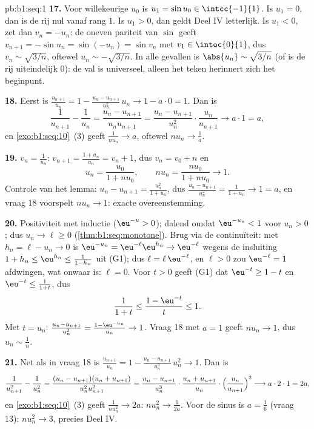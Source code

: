 \begin{solution}{pb:b1:seq:1}
\textbf{17.} Voor willekeurige $u_0$ is $u_1 = \sin u_0 \in
\intcc{-1}{1}$. Is $u_1 = 0$, dan is de rij nul vanaf rang $1$. Is $u_1 >
0$, dan geldt Deel IV letterlijk. Is $u_1 < 0$, zet dan $v_n = -u_n$: de
oneven pariteit van $\sin$ geeft $v_{n+1} = -\sin u_n = \sin(-u_n) = \sin
v_n$ met $v_1 \in \intoc{0}{1}$, dus $v_n \sim \sqrt{3/n}$, oftewel $u_n
\sim -\sqrt{3/n}$. In alle gevallen is $\abs{u_n} \sim \sqrt{3/n}$ (of is
de rij uiteindelijk $0$): de val is universeel, alleen het teken
herinnert zich het beginpunt.

\textbf{18.} Eerst is $\frac{u_{n+1}}{u_n} = 1 - \frac{u_n -
u_{n+1}}{u_n^2}\,u_n \to 1 - a \cdot 0 = 1$. Dan is
\[
\frac{1}{u_{n+1}} - \frac{1}{u_n}
= \frac{u_n - u_{n+1}}{u_n u_{n+1}}
= \frac{u_n - u_{n+1}}{u_n^2}\cdot\frac{u_n}{u_{n+1}}
\longrightarrow a \cdot 1 = a ,
\]
en \cref{exo:b1:seq:10}~(3) geeft $\frac{1}{n u_n} \to a$, oftewel $n u_n
\to \frac1a$.

\textbf{19.} $v_n = \frac{1}{u_n}$: $v_{n+1} = \frac{1 + u_n}{u_n} = v_n
+ 1$, dus $v_n = v_0 + n$ en
\[
u_n = \frac{u_0}{1 + n u_0} , \qquad
n u_n = \frac{n u_0}{1 + n u_0} \longrightarrow 1 .
\]
Controle van het lemma: $u_n - u_{n+1} = \frac{u_n^2}{1 + u_n}$, dus
$\frac{u_n - u_{n+1}}{u_n^2} = \frac{1}{1 + u_n} \to 1 = a$, en vraag 18
voorspelt $n u_n \to 1$: exacte overeenstemming.

\textbf{20.} Positiviteit met inductie ($\eu^{-u} > 0$); dalend omdat
$\eu^{-u_n} < 1$ voor $u_n > 0$; dus $u_n \to \ell \geq 0$
(\cref{thm:b1:seq:monotone}). Brug via de continuïteit: met $h_n = \ell -
u_n \to 0$ is $\eu^{-u_n} = \eu^{-\ell} \eu^{h_n} \to \eu^{-\ell}$ wegens
de insluiting $1 + h_n \leq \eu^{h_n} \leq \frac{1}{1 - h_n}$ uit (G1);
dus $\ell = \ell\, \eu^{-\ell}$, en $\ell > 0$ zou $\eu^{-\ell} = 1$
afdwingen, wat onwaar is: $\ell = 0$. Voor $t > 0$ geeft (G1) dat
$\eu^{-t} \geq 1 - t$ en $\eu^{-t} \leq \frac{1}{1 + t}$, dus
\[
\frac{1}{1 + t} \leq \frac{1 - \eu^{-t}}{t} \leq 1 .
\]
Met $t = u_n$: $\frac{u_n - u_{n+1}}{u_n^2} = \frac{1 -
\eu^{-u_n}}{u_n} \to 1$. Vraag 18 met $a = 1$ geeft $n u_n \to 1$, dus
$u_n \sim \frac1n$.

\textbf{21.} Net als in vraag 18 is $\frac{u_{n+1}}{u_n} = 1 - \frac{u_n
- u_{n+1}}{u_n^3}\,u_n^2 \to 1$. Dan is
\[
\frac{1}{u_{n+1}^2} - \frac{1}{u_n^2}
= \frac{(u_n - u_{n+1})(u_n + u_{n+1})}{u_n^2 u_{n+1}^2}
= \frac{u_n - u_{n+1}}{u_n^3}\cdot
\frac{u_n + u_{n+1}}{u_n}\cdot
\Bigl(\frac{u_n}{u_{n+1}}\Bigr)^2
\longrightarrow a \cdot 2 \cdot 1 = 2a ,
\]
en \cref{exo:b1:seq:10}~(3) geeft $\frac{1}{n u_n^2} \to 2a$: $n u_n^2
\to \frac{1}{2a}$. Voor de sinus is $a = \frac16$ (vraag 13): $n u_n^2
\to 3$, precies Deel IV.


\end{solution}
